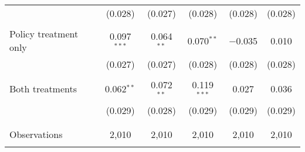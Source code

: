 \begin{tabular}{@{\extracolsep{5pt}}lccccc}
  & (0.028) & (0.027) & (0.028) & (0.028) & (0.028) \\ 
  & & & & & \\ 
 Policy treatment only & 0.097$^{***}$ & 0.064$^{**}$ & 0.070$^{**}$ & $-$0.035 & 0.010 \\ 
  & (0.027) & (0.027) & (0.028) & (0.028) & (0.028) \\ 
  & & & & & \\ 
 Both treatments & 0.062$^{**}$ & 0.072$^{**}$ & 0.119$^{***}$ & 0.027 & 0.036 \\ 
  & (0.029) & (0.028) & (0.029) & (0.029) & (0.029) \\ 
  & & & & & \\ 
\hline \\[-1.8ex] 

Observations & 2,010 & 2,010 & 2,010 & 2,010 & 2,010 \\ 
\hline 
\hline \\[-1.8ex] 
\end{tabular} 